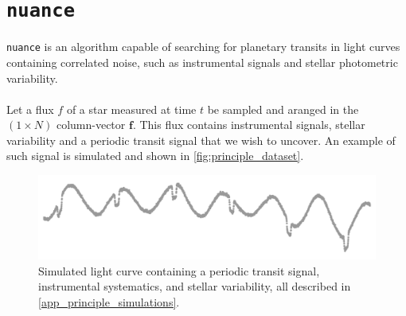 \documentclass{aastex631}
\begin{document}
\section{\texttt{nuance}}\label{nuance}

\texttt{nuance} is an algorithm capable of searching for planetary transits in light curves containing correlated noise, such as instrumental signals and stellar photometric variability.
\\\\
Let a flux $f$ of a star measured at time $t$ be sampled and aranged in the $(1\times N)$ column-vector $\bm{f}$. This flux contains instrumental signals, stellar variability and a periodic transit signal that we wish to uncover. An example of such signal is simulated and shown in \autoref{fig:principle_dataset}.

\begin{figure}[H]
    \begin{centering}
        \includegraphics[width=0.7\linewidth]{../figures/principle_dataset.pdf}
        \caption{Simulated light curve containing a periodic transit signal, instrumental systematics, and stellar variability, all described in \autoref{app_principle_simulations}.}
        \label{fig:principle_dataset}
    \end{centering}
\end{figure}
\end{document}
